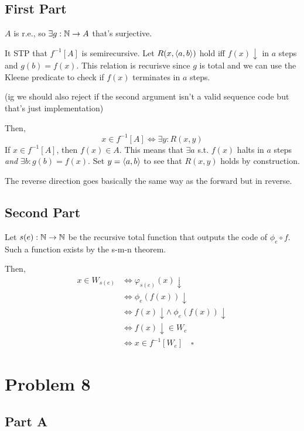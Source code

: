 \documentclass[12pt]{article}
\begin{document}
\subsection{First Part}

$A$ is r.e., so $\exists g: \mathbb{N} \to A$ that's surjective.

It STP that $f^{-1}[A]$ is semirecursive.
Let $R(x, \braket{a, b})$ hold iff $f(x)\downarrow$ in $a$ steps and $g(b)=f(x)$.
This relation is recurisve since $g$ is total and we can use the Kleene predicate
to check if $f(x)$ terminates in $a$ steps.

  {\footnotesize (ig we should also reject if the second argument isn't a valid sequence code but that's just implementation)}

Then,
\[x \in f^{-1}[A] \iff \exists y: R(x, y)\]
If $x \in f^{-1}[A]$, then $f(x) \in A$.
This means that $\exists a$ s.t. $f(x)$ halts in $a$ steps \textit{and} $\exists b: g(b)=f(x)$.
Set $y=\braket{a, b}$ to see that $R(x, y)$ holds by construction.

The reverse direction goes basically the same way as the forward but in reverse.

\subsection{Second Part}

Let $s(e): \mathbb{N} \to \mathbb{N}$ be the recursive total function that outputs the code of $\phi_e \circ f$.
Such a function exists by the s-m-n theorem.

Then,
\begin{align*}
  x \in W_{s(e)}
   & \iff \varphi_{s(e)}(x)\downarrow                  \\
   & \iff \phi_e(f(x))\downarrow                       \\
   & \iff f(x)\downarrow \land\ \phi_e(f(x))\downarrow \\
   & \iff f(x)\downarrow \in W_e                       \\
   & \iff x \in f^{-1}[W_e]\quad\square
\end{align*}

\pagebreak

\section{Problem 8}

\subsection{Part A}
\end{document}
